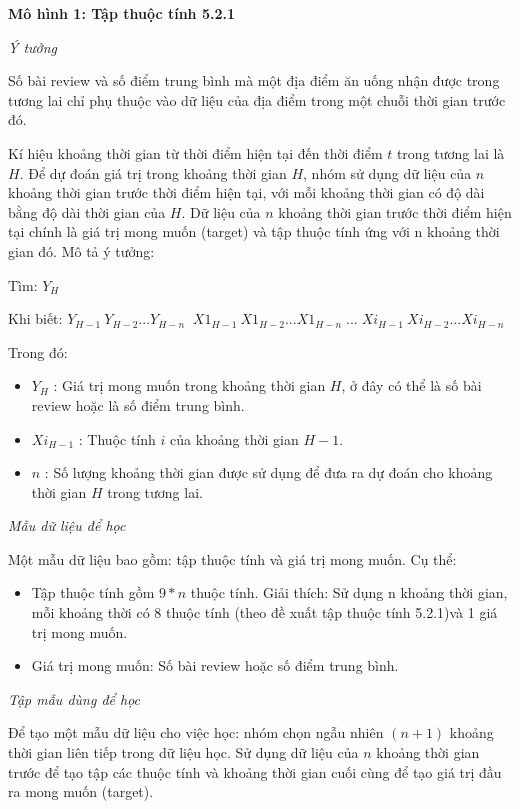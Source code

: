 \documentclass[12pt]{extarticle}
\begin{document}
			\par \textbf{Mô hình 1: Tập thuộc tính 5.2.1}
			\par \textit{Ý tưởng}
			\par Số bài review và số điểm trung bình mà một địa điểm ăn uống nhận được trong tương lai chỉ phụ thuộc vào dữ liệu của địa điểm trong một chuỗi thời gian trước đó.
			\par Kí hiệu khoảng thời gian từ thời điểm hiện tại đến thời điểm $t$ trong tương lai là $H$. Để dự đoán giá trị trong khoảng thời gian $H$, nhóm sử dụng dữ liệu của $n$ khoảng thời gian trước thời điểm hiện tại, với mỗi khoảng thời gian có độ dài bằng độ dài thời gian của $H$.  Dữ liệu của $n$ khoảng thời gian trước thời điểm hiện tại chính là giá trị mong muốn (target) và tập thuộc tính ứng với n khoảng thời gian đó. Mô tả ý tưởng:
				 \par \hspace{40pt}Tìm: \textbf{$Y_{H}$} \
				\par \hspace{40pt}Khi biết: $Y_{H-1}\:Y_{H-2}...Y_{H-n}\;\;X1_{H-1}\:X1_{H-2}...X1_{H-n}\;...\;Xi_{H-1}\:Xi_{H-2}...Xi_{H-n}$
			\par Trong đó:
				\begin{itemize}
					\item $  Y_{H}$ : Giá trị mong muốn trong khoảng thời gian $H$, ở đây có thể là số bài review hoặc là số điểm trung bình.
					\item $Xi_{H-1}$ : Thuộc tính $i$ của khoảng thời gian $H-1$.
					\item $n$ : Số lượng khoảng thời gian được sử dụng để đưa ra dự đoán cho khoảng thời gian $H$ trong tương lai.
				\end{itemize}
			\par \textit{Mẫu dữ liệu để học}
			\par Một mẫu dữ liệu bao gồm: tập thuộc tính và giá trị mong muốn. Cụ thể:
				\begin{itemize}
					\item Tập thuộc tính gồm $9*n$ thuộc tính. Giải thích: Sử dụng n khoảng thời gian, mỗi khoảng thời có 8 thuộc tính (theo đề xuất tập thuộc tính 5.2.1)và 1 giá trị mong muốn.  
					\item Giá trị mong muốn: Số bài review hoặc số điểm trung bình.
				\end{itemize}
			\par \textit{Tập mẫu dùng để học}
			\par Để tạo một mẫu dữ liệu cho việc học: nhóm chọn ngẫu nhiên $(n+1)$ khoảng thời gian liên tiếp trong dữ liệu học. Sử dụng dữ liệu của $n$ khoảng thời gian trước để tạo tập các thuộc tính và khoảng thời gian cuối cùng để tạo giá trị đầu ra mong muốn (target). 	 
\end{document}
